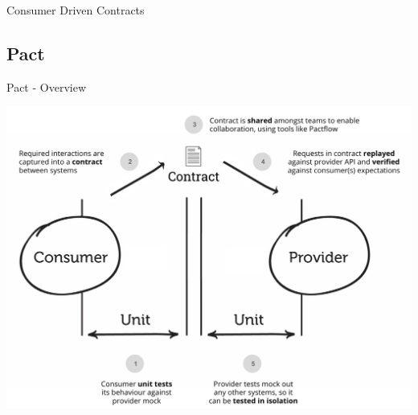 \begin{frame}{Consumer Driven Contracts}
{\begin{center}
    \end{center}
    }

\end{frame}


\subsection{Pact}
\begin{frame}{Pact - Overview}
    \begin{center}
        \includegraphics[width=.8\textwidth]{./assets/pact_overview}
    \end{center}
\end{frame}
